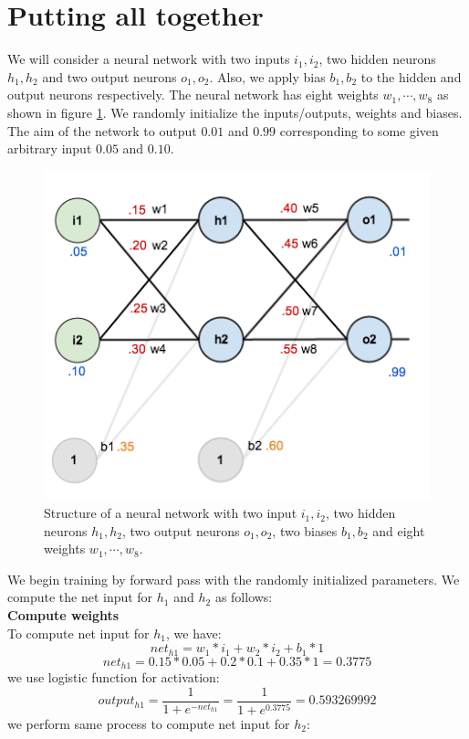 \documentclass[master]{thesis-uestc}
\begin{document}
\section{Putting all together}
We will consider a neural network with two inputs $i_1, i_2$, two hidden neurons $h_1, h_2$ and two output neurons $o_1, o_2$. Also, we apply bias $b_1, b_2$ to the hidden and output neurons respectively. The neural network has eight weights $w_1, \cdots, w_8$ as shown in figure \ref{neural_net_example}. We randomly initialize the inputs/outputs, weights and biases. The aim of the network to output $0.01$ and $0.99$ corresponding to some given arbitrary input $0.05$ and $0.10$.
\begin{figure}[ht]
\includegraphics[width=5in]{pic/network_example2.png}
\caption{Structure of a neural network with two input $i_1, i_2$,  two hidden neurons $h_1, h_2$, two output neurons $o_1, o_2$, two biases $b_1, b_2$ and eight weights $w_1, \cdots, w_8$.}
\label{neural_net_example}
\end{figure}
We begin training by forward pass with the randomly initialized parameters. We compute the net input for $h_1$ and $h_2$ as follows:\\
\textbf{Compute weights} \\
To compute net input for $h_1$, we have:
\[net_{h1} = w_1 * i_1 + w_2 * i_2 + b_1 * 1\]
\[net_{h1} = 0.15 * 0.05 + 0.2 * 0.1 + 0.35 * 1 = 0.3775\]
we use logistic function for activation:
\[output_{h1} = \frac{1}{1 + e^{-net_{h1}}} = \frac{1}{1 + e^{0.3775}} = 0.593269992\]
we perform same process to compute net input for $h_2$:
\end{document}
